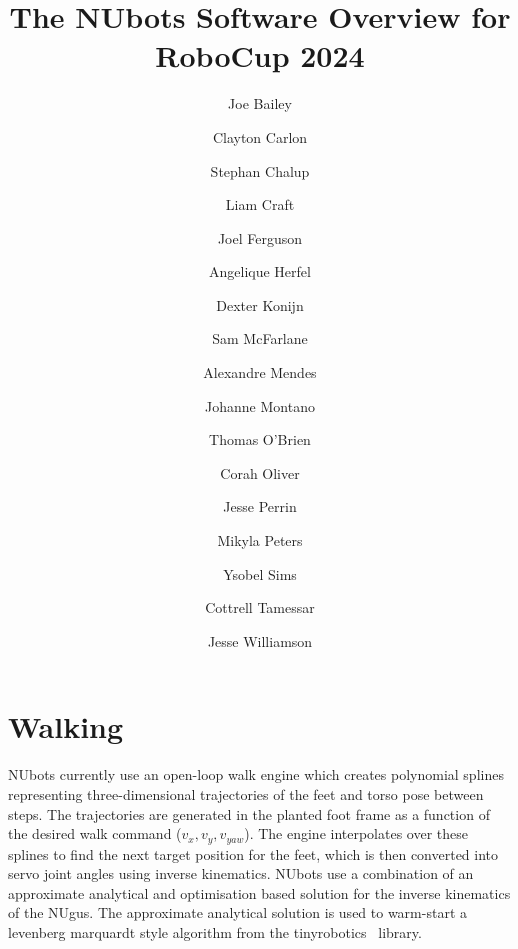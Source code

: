 \documentclass{llncs}
\begin{document}
%

\frontmatter          %
%
\pagestyle{headings}  %
%
%
\mainmatter              %
%
\title{The NUbots Software Overview for RoboCup 2024}
%

\author{Joe Bailey \and Clayton Carlon \and Stephan Chalup \and Liam Craft \and Joel Ferguson \and Angelique Herfel \and Dexter Konijn \and Sam McFarlane \and Alexandre Mendes \and Johanne Montano \and Thomas O'Brien \and Corah Oliver \and Jesse Perrin \and Mikyla Peters \and Ysobel Sims \and Cottrell Tamessar \and Jesse Williamson}
       
%
%
%
%

\maketitle              %

\section{Walking}


\medskip

NUbots currently use an open-loop walk engine which creates polynomial splines representing three-dimensional trajectories of the feet and torso pose between steps. The trajectories are generated in the planted foot frame as a function of the desired walk command ($v_x, v_y, v_{yaw}$). The engine interpolates over these splines to find the next target position for the feet, which is then converted into servo joint angles using inverse kinematics. NUbots use a combination of an approximate analytical and optimisation based solution for the inverse kinematics of the NUgus. The approximate analytical solution is used to warm-start a levenberg marquardt style algorithm from the tinyrobotics~\cite{tinyroboticsGit} library.
\end{document}
